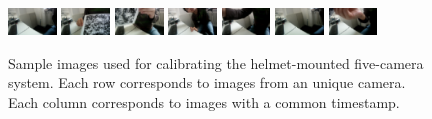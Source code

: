 \documentclass{report}
\begin{document}
\begin{figure}
\includegraphics[width=0.115\textwidth]{images/sampleimage/32-6} 
\includegraphics[width=0.115\textwidth]{images/sampleimage/48-6} 
\includegraphics[width=0.115\textwidth]{images/sampleimage/67-6} 
\includegraphics[width=0.115\textwidth]{images/sampleimage/125-6} 
\includegraphics[width=0.115\textwidth]{images/sampleimage/155-6} 
\includegraphics[width=0.115\textwidth]{images/sampleimage/197-6} 
\includegraphics[width=0.115\textwidth]{images/sampleimage/204-6} 
\caption{Sample images used for calibrating the helmet-mounted five-camera system. Each row corresponds to images from an unique camera. Each column corresponds to images with a common timestamp. }
\label{helmetImageFig}
\end{figure}
\end{document}
